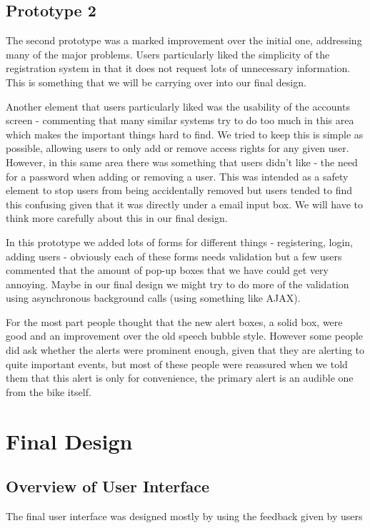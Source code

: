 \documentclass[a4paper]{report}
\begin{document}
\section{Prototype 2}
The second prototype was a marked improvement over the initial one, addressing many of the major problems. Users particularly liked the simplicity of the registration system in that it does not request lots of unnecessary information. This is something that we will be carrying over into our final design. 

Another element that users particularly liked was the usability of the accounts screen - commenting that many similar systems try to do too much in this area which makes the important things hard to find. We tried to keep this is simple as possible, allowing users to only add or remove access rights for any given user. However, in this same area there was something that users didn't like - the need for a password when adding or removing a user. This was intended as a safety element to stop users from being accidentally removed but users tended to find this confusing given that it was directly under a email input box. We will have to think more carefully about this in our final design.  

In this prototype we added lots of forms for different things - registering, login, adding users - obviously each of these forms needs validation but a few users commented that the amount of pop-up boxes that we have could get very annoying. Maybe in our final design we might try to do more of the validation using asynchronous background calls (using something like AJAX).

For the most part people thought that the new alert boxes, a solid box, were good  and an improvement over the old speech bubble style. However some people did ask whether the alerts were prominent enough, given that they are alerting to quite important events, but most of these people were reassured when we told them that this alert is only for convenience, the primary alert is an audible one from the bike itself.
\chapter{Final Design}
\section{Overview of User Interface}
The final user interface was designed mostly by using the feedback given by users 
\end{document}
